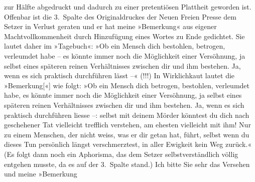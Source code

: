 \begin{ledgroupsized}[t]{13cm}
               zur Hälfte abgedruckt und dadurch zu einer pretentiösen Plattheit geworden ist.
               Offenbar ist die 3. Spalte des Originaldruckes der Neuen Freien Presse
               dem Setzer in Verlust geraten und er hat meine »Bemerkung« aus eigener
               Machtvollkommenheit durch Hinzufügung eines Wortes zu Ende gedichtet. Sie lautet
               daher im »Tagebuch«: »Ob ein Mensch dich
               bestohlen, betrogen, verleumdet habe – es könnte immer noch die Möglichkeit einer
               Versöhnung, ja selbst eines späteren reinen Verhältnisses zwischen dir und ihm
               bestehen. Ja, wenn es sich praktisch durchführen lässt –« (!!!)\pend
           \pstart
           In Wirklichkaut lautet die »Bemerkung{[}«{]} wie folgt:\pend
           \pstart
           »Ob ein Mensch dich betrogen, bestohlen, 
               verleumdet habe, es könnte immer noch die Möglichkeit einer Versöhnung, ja selbst
               eines späteren reinen Verhältnisses zwischen dir und ihm bestehen. Ja, wenn es sich
               praktisch durchführen liesse –: selbst mit deinem
               Mörder könntest du dich nach geschehener Tat vielleicht trefflich verstehen, am
               ehesten vielleicht mit ihm! Nur {\pb}zu einem Menschen, der
               nicht weiss, was er dir getan hat, führt, selbst wenn du dieses Tun persönlich längst
               verschmerztest, in aller Ewigkeit kein Weg zurück.«\pend
           \pstart
           (Es folgt dann noch ein Aphorisma, das dem Setzer selbstverständlich völlig entgehen
               musste, da es auf der 3. Spalte stand.)\pend
           \pstart
           Ich bitte Sie sehr das Versehen \label{K_L02476-1v}\label{K_L02476-1h} und meine »Bemerkung
\end{ledgroupsized}
